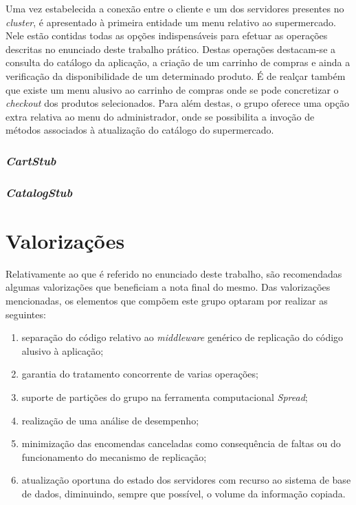 \documentclass[a4paper]{report}
\begin{document}
{		Uma vez estabelecida a conexão entre o cliente e um dos servidores presentes no \textit{cluster}, é apresentado à primeira entidade um menu relativo ao supermercado. Nele estão contidas todas as opções indispensáveis para efetuar as operações descritas no enunciado deste trabalho prático.
		Destas operações destacam-se a consulta do catálogo da aplicação, a criação de um carrinho de compras e ainda a verificação da disponibilidade de um determinado produto.
		É de realçar também que existe um menu alusivo ao carrinho de compras onde se pode concretizar o \textit{checkout} dos produtos selecionados.
		Para além destas, o grupo oferece uma opção extra relativa ao menu do administrador, onde se possibilita a invoção de métodos associados à atualização do catálogo do supermercado.

		\subsection{\textit{CartStub}} \label{subsec:ClientCartStub}


		\subsection{\textit{CatalogStub}} \label{subsec:ClientCatalogStub}

}

\chapter{Valorizações} \label{ch:ProblemDescription}
\large{
	Relativamente ao que é referido no enunciado deste trabalho, são recomendadas algumas valorizações que beneficiam a nota final do mesmo.
	Das valorizações mencionadas, os elementos que compõem este grupo optaram por realizar as seguintes:
	\begin{enumerate}
		\item separação do código relativo ao \textit{middleware} genérico de replicação do código alusivo à aplicação;
		\item garantia do tratamento concorrente de varias operações;
		\item suporte de partições do grupo na ferramenta computacional \textit{Spread};
		\item realização de uma análise de desempenho;
		\item minimização das encomendas canceladas como consequência de faltas ou do funcionamento do mecanismo de replicação;
		\item atualização oportuna do estado dos servidores com recurso ao sistema de base de dados, diminuindo, sempre que possível, o volume da informação copiada.
	\end{enumerate}
}
\end{document}
